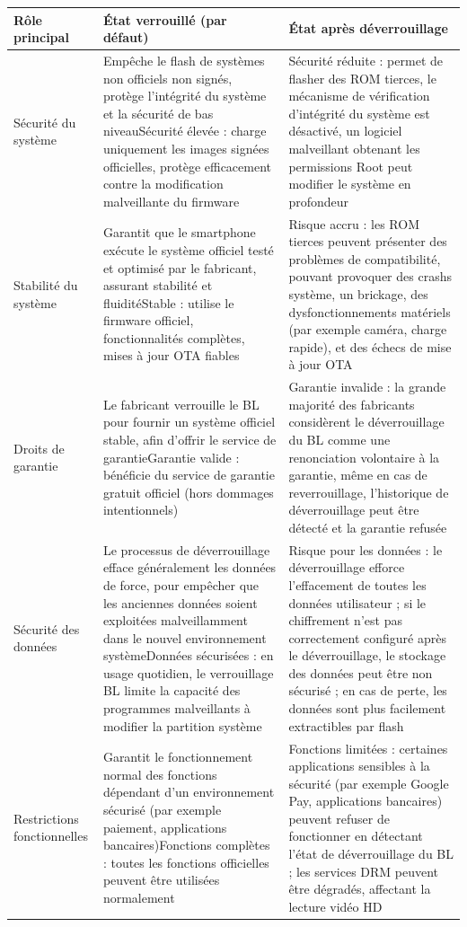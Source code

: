 \begin{center}
\begin{tabularx}{\linewidth}{|X|X|X|}
\hline
\textbf{Rôle principal} & \textbf{État verrouillé (par défaut)} & \textbf{État après déverrouillage} \tabularnewline
\hline
Sécurité du système & Empêche le flash de systèmes non officiels non signés, protège l'intégrité du système et la sécurité de bas niveau\newline Sécurité élevée : charge uniquement les images signées officielles, protège efficacement contre la modification malveillante du firmware & Sécurité réduite : permet de flasher des ROM tierces, le mécanisme de vérification d'intégrité du système est désactivé, un logiciel malveillant obtenant les permissions Root peut modifier le système en profondeur \tabularnewline
Stabilité du système & Garantit que le smartphone exécute le système officiel testé et optimisé par le fabricant, assurant stabilité et fluidité\newline Stable : utilise le firmware officiel, fonctionnalités complètes, mises à jour OTA fiables & Risque accru : les ROM tierces peuvent présenter des problèmes de compatibilité, pouvant provoquer des crashs système, un brickage, des dysfonctionnements matériels (par exemple caméra, charge rapide), et des échecs de mise à jour OTA \tabularnewline
Droits de garantie & Le fabricant verrouille le BL pour fournir un système officiel stable, afin d'offrir le service de garantie\newline Garantie valide : bénéficie du service de garantie gratuit officiel (hors dommages intentionnels) & Garantie invalide : la grande majorité des fabricants considèrent le déverrouillage du BL comme une renonciation volontaire à la garantie, même en cas de reverrouillage, l'historique de déverrouillage peut être détecté et la garantie refusée \tabularnewline
Sécurité des données & Le processus de déverrouillage efface généralement les données de force, pour empêcher que les anciennes données soient exploitées malveillamment dans le nouvel environnement système\newline Données sécurisées : en usage quotidien, le verrouillage BL limite la capacité des programmes malveillants à modifier la partition système & Risque pour les données : le déverrouillage efforce l'effacement de toutes les données utilisateur ; si le chiffrement n'est pas correctement configuré après le déverrouillage, le stockage des données peut être non sécurisé ; en cas de perte, les données sont plus facilement extractibles par flash \tabularnewline
Restrictions fonctionnelles & Garantit le fonctionnement normal des fonctions dépendant d'un environnement sécurisé (par exemple paiement, applications bancaires)\newline Fonctions complètes : toutes les fonctions officielles peuvent être utilisées normalement & Fonctions limitées : certaines applications sensibles à la sécurité (par exemple Google Pay, applications bancaires) peuvent refuser de fonctionner en détectant l'état de déverrouillage du BL ; les services DRM peuvent être dégradés, affectant la lecture vidéo HD \tabularnewline
\hline
\end{tabularx}
\end{center}

